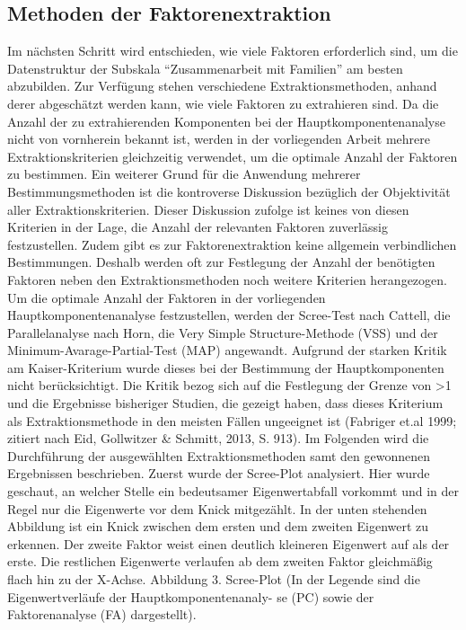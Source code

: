 \documentclass[12pt,a4paper]{article}
\begin{document}
\subsection{Methoden der Faktorenextraktion}
Im nächsten Schritt wird entschieden, wie viele Faktoren erforderlich sind, um die Datenstruktur der Subskala "`Zusammenarbeit mit Familien"' am besten abzubilden. Zur Verfügung stehen verschiedene Extraktionsmethoden, anhand derer abgeschätzt werden kann, wie viele Faktoren zu extrahieren sind. Da die Anzahl der zu extrahierenden Komponenten bei der Hauptkomponentenanalyse nicht von vornherein bekannt ist, werden in der vorliegenden Arbeit mehrere Extraktionskriterien gleichzeitig verwendet, um die optimale Anzahl der Faktoren zu bestimmen. Ein weiterer Grund für die Anwendung mehrerer Bestimmungsmethoden ist die kontroverse Diskussion bezüglich der Objektivität aller Extraktionskriterien. Dieser Diskussion zufolge ist keines von diesen Kriterien in der Lage, die Anzahl der relevanten Faktoren zuverlässig festzustellen. Zudem gibt es zur Faktorenextraktion keine allgemein verbindlichen Bestimmungen. Deshalb werden oft zur Festlegung der Anzahl der benötigten Faktoren neben den Extraktionsmethoden noch weitere Kriterien herangezogen.
	Um die optimale Anzahl der Faktoren in der vorliegenden Hauptkomponentenanalyse festzustellen, werden der Scree-Test nach Cattell, die Parallelanalyse nach Horn, die Very Simple Structure-Methode (VSS) und der Minimum-Avarage-Partial-Test (MAP) angewandt. Aufgrund der starken Kritik am Kaiser-Kriterium wurde dieses bei der Bestimmung der Hauptkomponenten nicht berücksichtigt. Die Kritik bezog sich auf die Festlegung der Grenze von >1 und die Ergebnisse bisheriger Studien, die gezeigt haben, dass dieses Kriterium als Extraktionsmethode in den meisten Fällen ungeeignet ist (Fabriger et.al 1999; zitiert nach Eid, Gollwitzer \& Schmitt, 2013, S. 913). 
	Im Folgenden wird die Durchführung der ausgewählten Extraktionsmethoden samt den gewonnenen Ergebnissen beschrieben. Zuerst wurde der Scree-Plot analysiert. Hier wurde geschaut, an welcher Stelle ein bedeutsamer Eigenwertabfall vorkommt und in der Regel nur die Eigenwerte vor dem Knick mitgezählt. In der unten stehenden Abbildung ist ein Knick zwischen dem ersten und dem zweiten Eigenwert zu erkennen. Der zweite Faktor weist einen deutlich kleineren Eigenwert auf als der erste. Die restlichen Eigenwerte verlaufen ab dem zweiten Faktor gleichmäßig flach hin zu der X-Achse. 
Abbildung 3. Scree-Plot (In der Legende sind die Eigenwertverläufe der Hauptkomponentenanaly- se (PC) sowie der Faktorenanalyse (FA) dargestellt).
\end{document}
